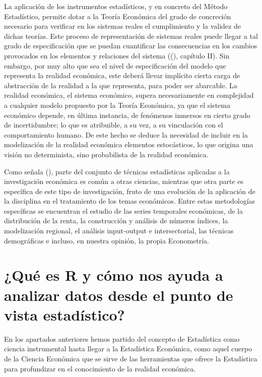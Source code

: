 \documentclass[
]{book}
\begin{document}
La aplicación de los instrumentos estadísticos, y en concreto del Método Estadístico, permite dotar a la Teoría Económica del grado de concreción necesario para verificar en los sistemas reales el cumplimiento y la validez de dichas teorías. Este proceso de representación de sistemas reales puede llegar a tal grado de especificación que se puedan cuantificar las consecuencias en los cambios provocados en los elementos y relaciones del sistema ((), capítulo II). Sin embargo, por muy alto que sea el nivel de especificación del modelo que representa la realidad económica, este deberá llevar implícito cierta carga de abstracción de la realidad a la que representa, para poder ser abarcable. La realidad económica, el sistema económico, supera necesariamente en complejidad a cualquier modelo propuesto por la Teoría Económica, ya que el sistema económico depende, en última instancia, de fenómenos inmersos en cierto grado de incertidumbre; lo que es atribuible, a su vez, a su vinculación con el comportamiento humano. De este hecho se deduce la necesidad de incluir en la modelización de la realidad económica elementos estocásticos, lo que origina una visión no determinista, sino probabilista de la realidad económica.

Como señala (), parte del conjunto de técnicas estadísticas aplicadas a la investigación económica es común a otras ciencias, mientras que otra parte es específica de este tipo de investigación, fruto de una evolución de la aplicación de la disciplina en el tratamiento de los temas económicos. Entre estas metodologías específicas se encuentran el estudio de las series temporales económicas, de la distribución de la renta, la construcción y análisis de números índices, la modelización regional, el análisis input-output e intersectorial, las técnicas demográficas e incluso, en nuestra opinión, la propia Econometría.

\section{¿Qué es R y cómo nos ayuda a analizar datos desde el punto de vista estadístico?}\label{quuxe9-es-r-y-cuxf3mo-nos-ayuda-a-analizar-datos-desde-el-punto-de-vista-estaduxedstico}

En los apartados anteriores hemos partido del concepto de Estadística como ciencia instrumental hasta llegar a la Estadística Económica, como aquel cuerpo de la Ciencia Económica que se sirve de las herramientas que ofrece la Estadística para profundizar en el conocimiento de la realidad económica.
\end{document}

